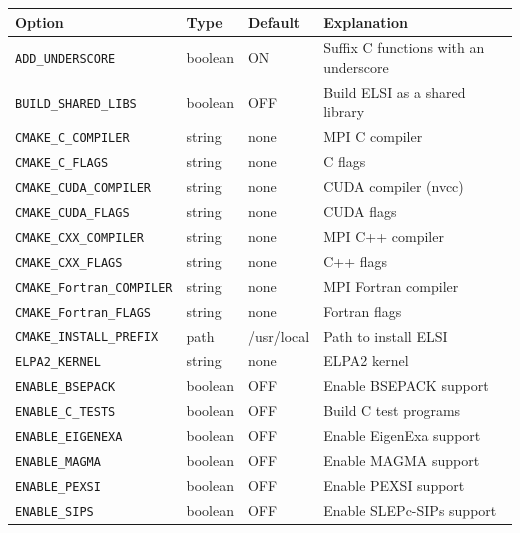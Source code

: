 \documentclass{report}
\begin{document}
\begin{longtable}[]{|p{40mm}|p{15mm}|p{20mm}|p{87mm}|}
\hline
\multicolumn{1}{|l|}{\textbf{Option}} & \multicolumn{1}{l|}{\textbf{Type}} & \multicolumn{1}{l|}{\textbf{Default}} & \multicolumn{1}{l|}{\textbf{Explanation}}\\
\hline
\texttt{ADD\_UNDERSCORE}          & boolean & ON          & Suffix C functions with an underscore\\
\hline
\texttt{BUILD\_SHARED\_LIBS}      & boolean & OFF         & Build ELSI as a shared library\\
\hline
\texttt{CMAKE\_C\_COMPILER}       & string  & none        & MPI C compiler\\
\hline
\texttt{CMAKE\_C\_FLAGS}          & string  & none        & C flags\\
\hline
\texttt{CMAKE\_CUDA\_COMPILER}    & string  & none        & CUDA compiler (nvcc)\\
\hline
\texttt{CMAKE\_CUDA\_FLAGS}       & string  & none        & CUDA flags\\
\hline
\texttt{CMAKE\_CXX\_COMPILER}     & string  & none        & MPI C++ compiler\\
\hline
\texttt{CMAKE\_CXX\_FLAGS}        & string  & none        & C++ flags\\
\hline
\texttt{CMAKE\_Fortran\_COMPILER} & string  & none        & MPI Fortran compiler\\
\hline
\texttt{CMAKE\_Fortran\_FLAGS}    & string  & none        & Fortran flags\\
\hline
\texttt{CMAKE\_INSTALL\_PREFIX}   & path    & /usr/local  & Path to install ELSI\\
\hline
\texttt{ELPA2\_KERNEL}            & string  & none        & ELPA2 kernel\\
\hline
\texttt{ENABLE\_BSEPACK}          & boolean & OFF         & Enable BSEPACK support\\
\hline
\texttt{ENABLE\_C\_TESTS}         & boolean & OFF         & Build C test programs\\
\hline
\texttt{ENABLE\_EIGENEXA}         & boolean & OFF         & Enable EigenExa support\\
\hline
\texttt{ENABLE\_MAGMA}            & boolean & OFF         & Enable MAGMA support\\
\hline
\texttt{ENABLE\_PEXSI}            & boolean & OFF         & Enable PEXSI support\\
\hline
\texttt{ENABLE\_SIPS}             & boolean & OFF         & Enable SLEPc-SIPs support\\

\end{longtable}
\end{document}
